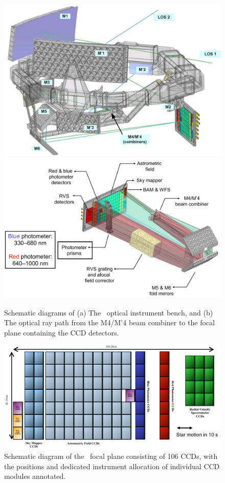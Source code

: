 \begin{figure}[h]
    \centering
    \includegraphics[width=0.8\linewidth]{Chapter4/gaia_optics.png}\\
    \vspace{25pt}
    \includegraphics[width=0.8\linewidth]{Chapter4/gaia_foc.png}
    \caption{Schematic diagrams of (a) The \Gaia~optical instrument bench, and (b) The optical ray path from the M4/M'4 beam combiner to the focal plane containing the CCD detectors.}
    \label{fig:gaia_instrument}
\end{figure}

\begin{figure}[h]
    \centering
    \includegraphics[width=0.9\linewidth]{Chapter4/gaia_detect_edit.png}
    \caption{Schematic diagram of the \Gaia~focal plane consisting of 106 CCDs, with the positions and dedicated instrument allocation of individual CCD modules annotated.}
    \label{fig:gaia_focalplane}
\end{figure}

